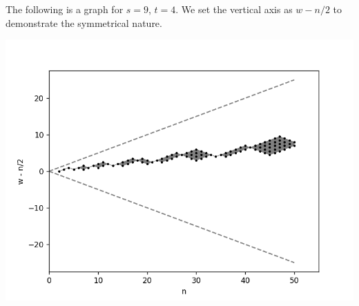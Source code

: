 \documentclass[]{article}
\begin{document}
The following is a graph for $s = 9$, $t = 4$. We set the vertical axis as $w - n/2$ to demonstrate the symmetrical nature.

\includegraphics[scale=0.8]{w-n.png}
\end{document}
